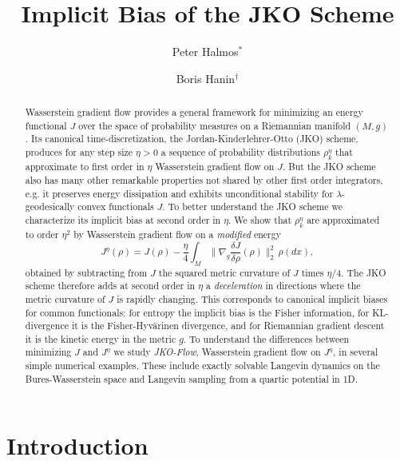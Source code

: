 \documentclass[reqno,11pt,letterpaper]{amsart}
\title{Implicit Bias of the JKO Scheme}
\author[P. Halmos]{Peter Halmos$^*$}\thanks{$\,^*$Princeton Computer Science, ph3641@princeton.edu; PH is supported by NIH/NCI grant U24CA248453 (PI: Benjamin J. Raphael).}
\author[B. Hanin]{Boris Hanin$^\dagger$}\thanks{$\,^\dagger$Princeton ORFE, bhanin@princeton.edu;  BH is supported by a 2024 Sloan Fellowship in Mathematics, NSF CAREER grant DMS-2143754, and NSF grant DMS-2133806, and DARPA AIQ grant (HR001124S0029)}
\theoremstyle{plain}
\theoremstyle{definition}
\theoremstyle{remark}
\begin{document}
\maketitle

\begin{abstract}
Wasserstein gradient flow provides a general framework for minimizing an energy functional $J$ over the space of probability measures on a Riemannian manifold $(M,g)$. Its canonical time-discretization, the Jordan-Kinderlehrer-Otto (JKO) scheme, produces for any step size $\eta>0$ a sequence of probability distributions $\rho_k^\eta$ that approximate to first order in $\eta$ Wasserstein gradient flow on $J$. But the JKO scheme also has many other remarkable properties not shared by other first order integrators, e.g. it preserves energy dissipation and exhibits unconditional stability for $\lambda$-geodesically convex functionals $J$. To better understand the JKO scheme we characterize its implicit bias at second order in $\eta$. We show that $\rho_k^\eta$ are approximated to order $\eta^2$ by Wasserstein gradient flow on a \emph{modified} energy
\[
J^{\eta}(\rho) = J(\rho) - \frac{\eta}{4}\int_M \Big\lVert \nabla_g \frac{\delta J}{\delta \rho} (\rho) \Big\rVert_{2}^{2} \,\rho(dx),
\]
obtained by subtracting from $J$ the squared metric curvature of $J$ times $\eta/4$. The JKO scheme therefore adds at second order in $\eta$ a \textit{deceleration} in directions where the metric curvature of $J$ is rapidly changing. This corresponds to canonical implicit biases for common functionals: for entropy the implicit bias is the Fisher information, for KL-divergence it is the Fisher-Hyv{\"a}rinen divergence, and for Riemannian gradient descent it is the kinetic energy in the metric $g$. To understand the differences between minimizing $J$ and $J^\eta$ we study \emph{JKO-Flow}, Wasserstein gradient flow on $J^\eta$, in several simple numerical examples. These include exactly solvable Langevin dynamics on the Bures-Wasserstein space and Langevin sampling from a quartic potential in 1D. 
\end{abstract}






\section{Introduction}
\end{document}
